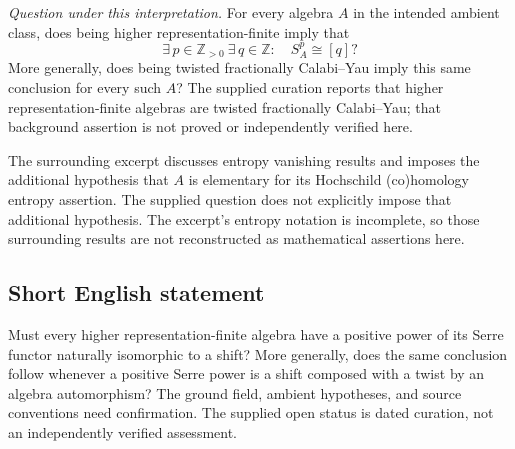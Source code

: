 \documentclass[11pt]{article}
\newcommand{\Z}{\mathbb{Z}}
\begin{document}
\emph{Question under this interpretation.} For every algebra \(A\) in the intended ambient class, does being higher representation-finite imply that
\[
\exists\,p\in\Z_{>0}\ \exists\,q\in\Z:\quad S_A^p\cong[q]?
\]
More generally, does being twisted fractionally Calabi--Yau imply this same conclusion for every such \(A\)? The supplied curation reports that higher representation-finite algebras are twisted fractionally Calabi--Yau; that background assertion is not proved or independently verified here.

The surrounding excerpt discusses entropy vanishing results and imposes the additional hypothesis that \(A\) is elementary for its Hochschild (co)homology entropy assertion. The supplied question does not explicitly impose that additional hypothesis. The excerpt's entropy notation is incomplete, so those surrounding results are not reconstructed as mathematical assertions here.
\subsection{Short English statement}
Must every higher representation-finite algebra have a positive power of its Serre functor naturally isomorphic to a shift? More generally, does the same conclusion follow whenever a positive Serre power is a shift composed with a twist by an algebra automorphism? The ground field, ambient hypotheses, and source conventions need confirmation. The supplied open status is dated curation, not an independently verified assessment.
\end{document}

